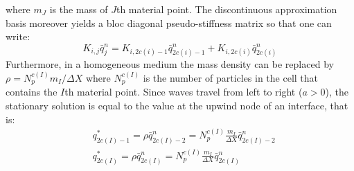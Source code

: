 where $m_J$ is the mass of $J$th material point. The discontinuous approximation basis moreover yields a bloc diagonal pseudo-stiffness matrix so that one can write:
\begin{equation}
  \label{eq:block_diag_K}
  K_{i,j} \bar{q}_{j}^{n}= K_{i,2c(i)-1} \bar{q}_{2c(i)-1}^{n}+K_{i,2c(i)} \bar{q}_{2c(i)}^{n}
\end{equation}
Furthermore, in a homogeneous medium the mass density can be replaced by $\rho = N_p^{c( I)} m_I/\Delta X$ where $N_p^{c( I)}$ is the number of particles in the cell that contains the $I$th material point. Since waves travel from left to right ($a>0$), the stationary solution is equal to the value at the upwind node of an interface, that is:
\begin{align}
  & q_{2c(I)-1}^* = \rho \bar{q}^n_{2c(I)-2}=  N_p^{c( I)}\frac{ m_I}{\Delta X}\bar{q}^n_{2c(I)-2} \\
  & q_{2c(I)}^* = \rho \bar{q}^n_{2c(I)} =  N_p^{c( I)}\frac{ m_I}{\Delta X} \bar{q}^n_{2c(I)} 
\end{align}

